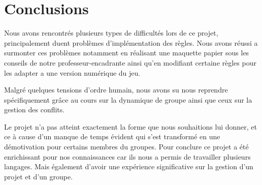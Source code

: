 \documentclass[a4paper, titlepage]{livret}
\begin{document}
 \chapter{Conclusions}
 	Nous avons rencontrés plusieurs types de difficultés lors de ce projet, principalement duent problèmes d’implémentation des règles. Nous avons réussi a surmonter ces problèmes notamment en réalisant une maquette papier sous les conseils de notre professeur-encadrante ainsi qu’en modifiant certaine règles pour les adapter a une version numérique du jeu.
 	
	Malgré quelques tensions d’ordre humain, nous avons su nous reprendre spécifiquement grâce au cours sur la dynamique de groupe ainsi que ceux sur la gestion des conflits. 
	
	Le projet n’a pas atteint exactement la forme que nous souhaitions lui donner, et ce à cause d’un manque de temps évident qui s’est transformé en une démotivation pour certains membres du groupes. 
	Pour conclure ce projet a été enrichissant pour nos connaissances car ils nous a permis de travailler plusieurs langages. Mais également d’avoir une expérience significative sur la gestion d’un projet et d’un groupe. 
\end{document}
